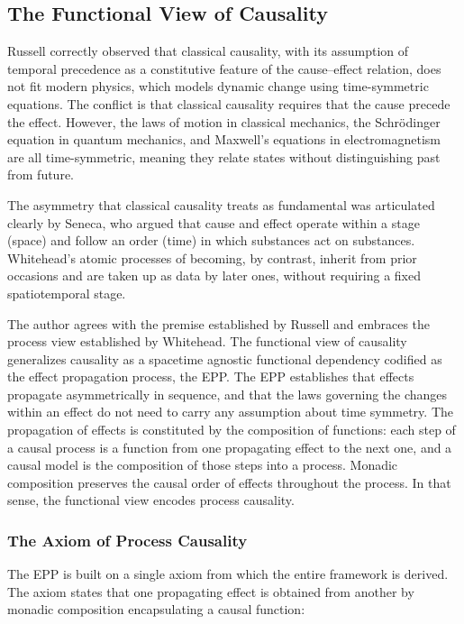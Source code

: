 \subsection{The Functional View of Causality}
\label{sec:philosophy_functional}

Russell correctly observed that classical causality, with its assumption
of temporal precedence as a constitutive feature of the cause–effect
relation, does not fit modern physics, which models dynamic change using
time-symmetric equations. The conflict is that classical causality
requires that the cause precede the effect. However, the laws of motion in
classical mechanics, the Schrödinger equation in quantum mechanics, and
Maxwell's equations in electromagnetism are all time-symmetric, meaning
they relate states without distinguishing past from future. 

The asymmetry that classical causality treats as fundamental was articulated clearly by Seneca, who argued that cause and effect operate within a stage (space) and follow an order (time) in which substances act on substances. Whitehead's atomic processes of becoming, by contrast, inherit from prior occasions and are taken up as data by later ones, without requiring a fixed spatiotemporal stage.


The author agrees with the premise established by Russell and embraces the process view established by Whitehead. The functional view of causality generalizes causality as a spacetime agnostic functional dependency codified as the effect propagation process, the EPP. The EPP establishes that  effects propagate asymmetrically in sequence, and that the laws governing 
the changes within an effect do not need to carry any assumption about time symmetry. The propagation of effects is constituted by the composition of functions: each step of a causal process is a function from one propagating effect to the next one, and a causal model is the composition of those steps into a process. Monadic composition preserves the causal order of effects throughout the process. In that sense, the functional view encodes process causality.    
 
\subsubsection{The Axiom of Process Causality}

The EPP is built on a single axiom from which the entire framework is
derived. The axiom states that one propagating effect is obtained from
another by monadic composition encapsulating a causal function:
 
